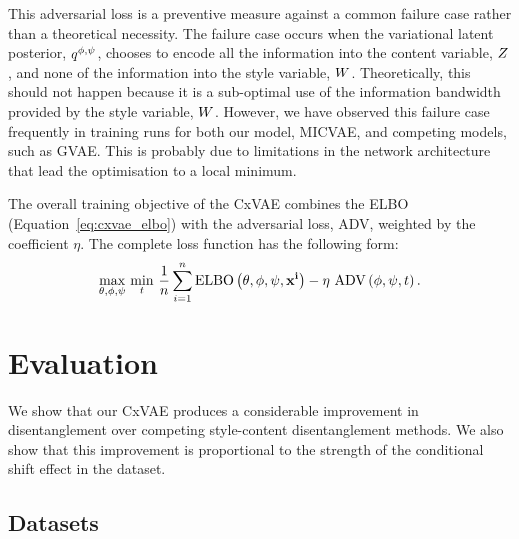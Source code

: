 \documentclass[../thesis.tex]{subfiles}
\begin{document}
This adversarial loss is a preventive measure against a common failure case rather than a theoretical necessity. The failure case occurs when the variational latent posterior, $q^{\phi,\psi}$, chooses to encode all the information into the content variable, $\myrv{z}$, and none of the information into the style variable, $\myrv{w}$. Theoretically, this should not happen because it is a sub-optimal use of the information bandwidth provided by the style variable, $\myrv{w}$. However, we have observed this failure case frequently in training runs for both our model, MICVAE, and competing models, such as GVAE. This is probably due to limitations in the network architecture that lead the optimisation to a local minimum.

The overall training objective of the CxVAE combines the ELBO (Equation~\ref{eq:cxvae_elbo}) with the adversarial loss, ADV, weighted by the coefficient $\eta$. The complete loss function has the following form:
\[
      \underset{\theta,\phi,\psi}{\mathrm{max}} ~ \underset{t}{\mathrm{min}} ~ \frac{1}{n} \sum_{i=1}^{n} \mathrm{ELBO}\left( \theta, \phi, \psi, \mathbf{{x^i}} \right) - \eta ~ \mathrm{ADV} \left( \phi, \psi, t \right).
\]


\section{Evaluation}
\label{sec:evaluation}


We show that our CxVAE produces a considerable improvement in disentanglement over competing style-content disentanglement methods. We also show that this improvement is proportional to the strength of the conditional shift effect in the dataset.


\subsection{Datasets}
\label{sec:dataset}
\end{document}
